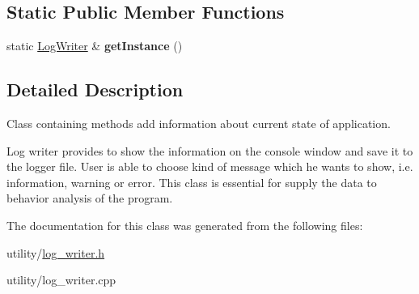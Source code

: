 \subsection*{Static Public Member Functions}
\begin{DoxyCompactItemize}
\item 
\mbox{\label{class_log_writer_a112a7c453bb431bd776a1486567a516a}} 
static \hyperlink{class_log_writer}{Log\+Writer} \& {\bfseries get\+Instance} ()
\end{DoxyCompactItemize}


\subsection{Detailed Description}
Class containing methods add information about current state of application. 

Log writer provides to show the information on the console window and save it to the logger file. User is able to choose kind of message which he wants to show, i.\+e. information, warning or error. This class is essential for supply the data to behavior analysis of the program. 

The documentation for this class was generated from the following files\+:\begin{DoxyCompactItemize}
\item 
utility/\hyperlink{log__writer_8h}{log\+\_\+writer.\+h}\item 
utility/log\+\_\+writer.\+cpp\end{DoxyCompactItemize}
